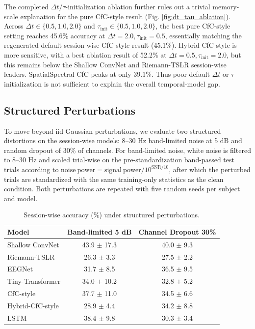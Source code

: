 \documentclass[journal]{IEEEtran}
\begin{document}
The completed $\Delta t$/$\tau$-initialization ablation further rules out a trivial memory-scale explanation for the pure CfC-style result (Fig. \ref{fig:dt_tau_ablation}). Across $\Delta t \in \{0.5,1.0,2.0\}$ and $\tau_{\mathrm{init}}\in\{0.5,1.0,2.0\}$, the best pure CfC-style setting reaches 45.6\% accuracy at $\Delta t=2.0,\tau_{\mathrm{init}}=0.5$, essentially matching the regenerated default session-wise CfC-style result (45.1\%). Hybrid-CfC-style is more sensitive, with a best ablation result of 52.2\% at $\Delta t=0.5,\tau_{\mathrm{init}}=2.0$, but this remains below the Shallow ConvNet and Riemann-TSLR session-wise leaders. SpatialSpectral-CfC peaks at only 39.1\%. Thus poor default $\Delta t$ or $\tau$ initialization is not sufficient to explain the overall temporal-model gap.

\subsection{Structured Perturbations}
To move beyond iid Gaussian perturbations, we evaluate two structured distortions on the session-wise models: 8--30 Hz band-limited noise at 5 dB and random dropout of 30\% of channels. For band-limited noise, white noise is filtered to 8--30 Hz and scaled trial-wise on the pre-standardization band-passed test trials according to $\mathrm{noise\ power} = \mathrm{signal\ power}/10^{\mathrm{SNR}/10}$, after which the perturbed trials are standardized with the same training-only statistics as the clean condition. Both perturbations are repeated with five random seeds per subject and model.

\begin{table}[t]
  \centering
  \footnotesize
  \caption{Session-wise accuracy ($\%$) under structured perturbations.}
  \begin{tabular}{lcc}
    \toprule
    \textbf{Model} & \textbf{Band-limited 5 dB} & \textbf{Channel Dropout 30\%} \\
    \midrule
    Shallow ConvNet & 43.9 $\pm$ 17.3 & 40.0 $\pm$ 9.3 \\
    Riemann-TSLR & 26.3 $\pm$ 3.3 & 27.5 $\pm$ 2.2 \\
    EEGNet & 31.7 $\pm$ 8.5 & 36.5 $\pm$ 9.5 \\
    Tiny-Transformer & 34.0 $\pm$ 10.2 & 32.8 $\pm$ 5.2 \\
    CfC-style & 37.7 $\pm$ 11.0 & 34.5 $\pm$ 6.6 \\
    Hybrid-CfC-style & 28.9 $\pm$ 4.4 & 34.2 $\pm$ 8.8 \\
    LSTM & 38.4 $\pm$ 9.8 & 30.3 $\pm$ 3.4 \\
    \bottomrule
  \end{tabular}
  \label{tab:noise}
\end{table}
\end{document}
